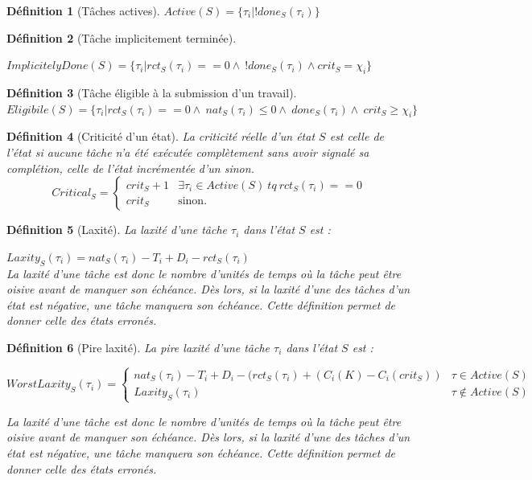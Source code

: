 \documentclass[11pt,a4paper,oneside]{book}
\theoremstyle{break}
\newtheorem{defin}{Définition}
\theoremstyle{breakplain}
\begin{document}
\begin{defin}[Tâches actives]
\label{active}
$Active(S) = \{\tau_i | !done_S(\tau_i)\}$
\end{defin}


\begin{defin}[Tâche implicitement terminée]
\label{impdone}

$ImplicitelyDone(S) = \{\tau_i | rct_S(\tau_i) == 0 \wedge\ !done_S(\tau_i)\wedge crit_S=\chi_i\}$\\
\end{defin}


\begin{defin}[Tâche éligible à la submission d'un travail]
\label{eligible}
$Eligibile(S) = \{\tau_i | rct_S(\tau_i) == 0 \wedge\ nat_S(\tau_i) \leq 0 \wedge\ done_S(\tau_i)\wedge\ crit_S\geq\chi_i\}$\\
\end{defin}


\begin{defin}[Criticité d'un état]
\label{critical}
La criticité réelle d'un état $S$ est celle de l'état si aucune tâche n'a été exécutée complètement sans avoir signalé sa complétion, celle de l'état incrémentée d'un sinon.
$$
Critical_S = \left\{
    \begin{array}{ll}
        crit_S+1 & \exists \tau_i \in Active(S)\ tq\ rct_S(\tau_i) == 0 \\
        crit_S & \mbox{sinon.}
    \end{array}
\right.
$$
\end{defin}

\begin{defin}[Laxité]
\label{laxity}
La laxité d'une tâche $\tau_i$ dans l'état $S$ est :

$Laxity_S(\tau_i) = nat_S(\tau_i) -T_i + D_i - rct_S(\tau_i)$\\

La laxité d'une tâche est donc le nombre d'unités de temps où la tâche peut être oisive avant de manquer son échéance. Dès lors, si la laxité d'une des tâches d'un état est négative, une tâche manquera son échéance. Cette définition permet de donner celle des états erronés.
\end{defin}

\begin{defin}[Pire laxité]
\label{worstlaxity}
La pire laxité d'une tâche $\tau_i$ dans l'état $S$ est :

$$
WorstLaxity_S(\tau_i) =\left\{
    \begin{array}{ll}
        nat_S(\tau_i) -T_i + D_i - (rct_S(\tau_i) + (C_i(K)-C_i(crit_S)) & \tau \in Active(S) \\
        Laxity_S(\tau_i) & \tau \notin Active(S)
    \end{array}
\right.
$$

La laxité d'une tâche est donc le nombre d'unités de temps où la tâche peut être oisive avant de manquer son échéance. Dès lors, si la laxité d'une des tâches d'un état est négative, une tâche manquera son échéance. Cette définition permet de donner celle des états erronés.
\end{defin}
\end{document}
